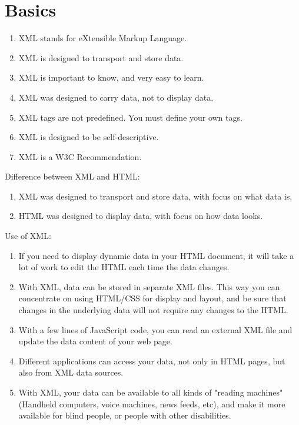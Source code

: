 \documentclass[a4paper,oneside]{book}
\begin{document}
\section{Basics}
\begin{enumerate}
\item XML stands for eXtensible Markup Language.
\item XML is designed to transport and store data.
\item XML is important to know, and very easy to learn.
\item XML was designed to carry data, not to display data.
\item XML tags are not predefined. You must define your own tags.
\item XML is designed to be self-descriptive.
\item XML is a W3C Recommendation.
\end{enumerate}
Difference between XML and HTML:
\begin{enumerate}
\item XML was designed to transport and store data, with focus on what data is.
\item HTML was designed to display data, with focus on how data looks.
\end{enumerate}
Use of XML:
\begin{enumerate}
\item If you need to display dynamic data in your HTML document, it will take a lot of work to edit the HTML each time the data changes.
\item With XML, data can be stored in separate XML files. This way you can concentrate on using HTML/CSS for display and layout, and be sure that changes in the underlying data will not require any changes to the HTML.
\item With a few lines of JavaScript code, you can read an external XML file and update the data content of your web page.
\item Different applications can access your data, not only in HTML pages, but also from XML data sources.
\item With XML, your data can be available to all kinds of "reading machines" (Handheld computers, voice machines, news feeds, etc), and make it more available for blind people, or people with other disabilities.
\end{enumerate}
\end{document}
